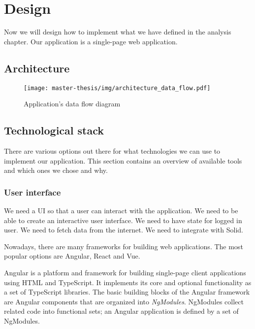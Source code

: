 \chapter{Design}
Now we will design how to implement what we have defined in the analysis chapter.
Our application is a single-page web application.

\section{Architecture}
\begin{figure}[h]
  \centering
  \texttt{[image: master-thesis/img/architecture\_data\_flow.pdf]}
  \caption{Application's data flow diagram}
\end{figure}


\section{Technological stack}
There are various options out there for what technologies we can use to implement our application.
This section contains an overview of available tools and which ones we chose and why.

\subsection*{User interface}
  We need a UI so that a user can interact with the application.
  We need to be able to create an interactive user interface.
  We need to have state for logged in user.
  We need to fetch data from the internet.
  We need to integrate with Solid.

  Nowadays, there are many frameworks for building web applications.
  The most popular options are Angular, React and Vue.

  Angular is a platform and framework for building single-page client applications using HTML and TypeScript. 
  It implements its core and optional functionality as a set of TypeScript libraries. 
  The basic building blocks of the Angular framework are Angular components that are organized into \emph{NgModules}. 
  NgModules collect related code into functional sets; an Angular application is defined by a set of NgModules.

